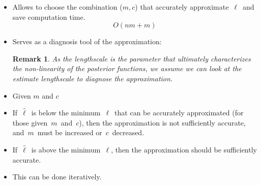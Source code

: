 \documentclass[8pt]{beamer} %
\newtheorem*{remark}{Remark}
\begin{document}
\begin{frame}

\begin{tcolorbox}[colframe=blue!20, colback=white, title={\small Insights from this model of relationships}, colbacktitle=lightblue, coltitle=black, boxrule=0.5pt]

\begin{itemize}\setlength\itemsep{1mm}
\item Allows to  choose the combination ($m,c$) that accurately approximate\, $\ell$\, and save computation time.\\[-5mm]
$$
O(nm+m)
$$

\item Serves as a {\color{navyblue} diagnosis tool} of the approximation:

\begin{remark}
As the lengthscale is the parameter that ultimately characterizes the non-linearity of the posterior functions, we assume we can look at the {\color{navyblue} estimate lengthscale} to diagnose the approximation.
\end{remark}

\vspace{2mm}
\item Given $m$ and $c$

\item If\, $\hat{\ell}$\, {\color{navyblue} is below} the minimum\, $\ell$\, that can be accurately approximated (for those given\, $m$\, and\, $c$), then the approximation {\color{navyblue} is not sufficiently accurate}, and\, $m$\, must be increased or\, $c$\, decreased.

\item If\, $\hat{\ell}$\, {\color{navyblue} is above} the minimum\, $\ell$, then the approximation should be {\color{navyblue} sufficiently accurate}.

\item This can be done iteratively.

\end{itemize}
\end{tcolorbox}
\end{frame}
\end{document}
